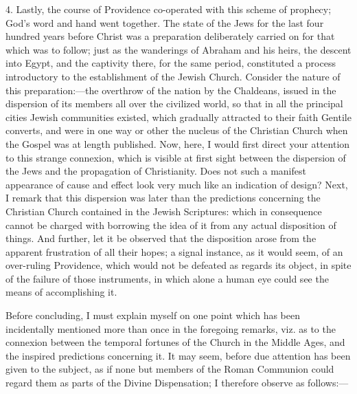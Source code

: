 4. Lastly, the course of Providence co-operated with this scheme of
prophecy; God's word and hand went together. The state of the Jews for
the last four hundred years before Christ was a preparation deliberately
carried on for that which was to follow; just as the wanderings of
Abraham and his heirs, the descent into Egypt, and the captivity there,
for the same period, constituted a process introductory to the
establishment of the Jewish Church. Consider the nature of this
preparation:—the overthrow of the nation by the Chaldeans, issued in
the dispersion of its members all over the civilized world, so that in
all the principal cities Jewish communities existed, which gradually
attracted to their faith Gentile converts, and were in one way or other
the nucleus of the Christian Church when the Gospel was at length
published. Now, here, I would first direct your attention to this
strange connexion, which is visible at first sight between the
dispersion of the Jews and the propagation of Christianity. Does not
such a manifest appearance of cause and effect look very much like an
indication of design? Next, I remark that this dispersion was later than
the predictions concerning the Christian Church contained in the Jewish
Scriptures: which in consequence cannot be charged with borrowing the
idea of it from any actual disposition of things. And further, let it be
observed that the disposition arose from the apparent frustration of all
their hopes; a signal instance, as it would seem, of an over-ruling
Providence, which would not be defeated as regards its object, in spite
of the failure of those instruments, in which alone a human eye could
see the means of accomplishing it.

Before concluding, I must explain myself on one point which has been
incidentally mentioned more than once in the foregoing remarks, viz. as
to the connexion between the temporal fortunes of the Church in the
Middle Ages, and the inspired predictions concerning it. It may seem,
before due attention has been given to the subject, as if none but
members of the Roman Communion could regard them as parts of the Divine
Dispensation; I therefore observe as follows:—

